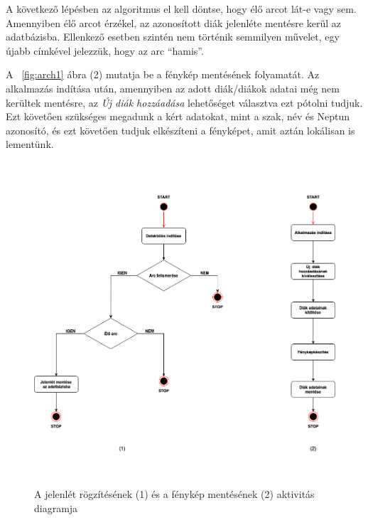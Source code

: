 A következő lépésben az algoritmus el kell döntse, hogy élő arcot lát-e vagy sem. Amennyiben élő arcot érzékel, az azonosított diák jelenléte mentésre kerül az adatbázisba. Ellenkező esetben szintén nem történik semmilyen művelet, egy újabb címkével jelezzük, hogy az arc \enquote{hamis}.

A ~\ref{fig:arch1} ábra (2) mutatja be a fénykép mentésének folyamatát. Az alkalmazás indítása után, amennyiben az adott diák/diákok adatai még nem kerültek mentésre, az \textit{Új diák hozzáadása} lehetőséget választva ezt pótolni tudjuk. Ezt követően szükséges megadunk a kért adatokat, mint a szak, név és Neptun azonosító, és ezt követően tudjuk elkészíteni a fényképet, amit aztán lokálisan is lementünk.


\begin{figure}[htbp]
	\includegraphics[width=15cm,height=12cm]{figures/activity11.png}
	\caption{A jelenlét rögzítésének (1) és a fénykép mentésének (2) aktivitás diagramja}
	\label{fig:activity1}
\end{figure}





